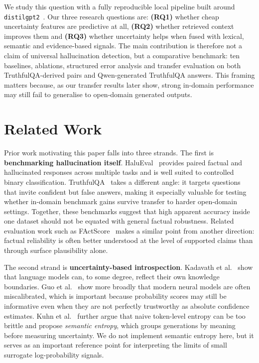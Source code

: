 \documentclass[conference]{IEEEtran}
\begin{document}
We study this question with a fully reproducible local pipeline built around
\texttt{distilgpt2}~\cite{radford2019gpt2}. Our three research questions are:
\textbf{(RQ1)} whether cheap uncertainty features are predictive at all,
\textbf{(RQ2)} whether retrieved context improves them and \textbf{(RQ3)}
whether uncertainty helps when fused with lexical, semantic and evidence-based
signals. The main contribution is therefore not a claim of universal
hallucination detection, but a comparative benchmark: ten baselines, ablations,
structured error analysis and transfer evaluation on both TruthfulQA-derived
pairs and Qwen-generated TruthfulQA answers. This framing matters because, as
our transfer results later show, strong in-domain performance may still fail to
generalise to open-domain generated outputs.

\section{Related Work}
\label{sec:related}

Prior work motivating this paper falls into three strands. The first is
\textbf{benchmarking hallucination itself}. HaluEval~\cite{li2023halueval}
provides paired factual and hallucinated responses across multiple tasks and is
well suited to controlled binary classification. TruthfulQA~\cite{lin2022truthfulqa}
takes a different angle: it targets questions that invite confident but false
answers, making it especially valuable for testing whether in-domain benchmark
gains survive transfer to harder open-domain settings. Together, these
benchmarks suggest that high apparent accuracy inside one dataset should not be
equated with general factual robustness. Related evaluation work such as
FActScore~\cite{min2023factscore} makes a similar point from another direction:
factual reliability is often better understood at the level of supported claims
than through surface plausibility alone.

The second strand is \textbf{uncertainty-based introspection}. Kadavath et
al.~\cite{kadavath2022know} show that language models can, to some degree,
reflect their own knowledge boundaries. Guo et al.~\cite{guo2017calibration}
show more broadly that modern neural models are often miscalibrated, which is
important because probability scores may still be informative even when they
are not perfectly trustworthy as absolute confidence estimates. Kuhn et
al.~\cite{kuhn2023semantic} further argue that naive token-level entropy can be
too brittle and propose \emph{semantic entropy}, which groups generations by
meaning before measuring uncertainty. We do not implement semantic entropy
here, but it serves as an important reference point for interpreting the limits
of small surrogate log-probability signals.
\end{document}
